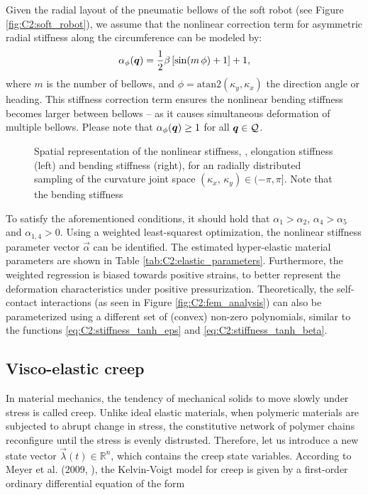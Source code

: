 %
\begin{asm}
Given the radial layout of the pneumatic bellows of the soft robot (see Figure \ref{fig:C2:soft_robot}), we assume that the nonlinear correction term for asymmetric radial stiffness along the circumference can be modeled by:
%
\begin{equation}
\alpha_\phi ({\boldsymbol{q}}) = \frac{1}{2}\beta \left[\sin( m \,\phi) + 1 \right] + 1,
\end{equation}
%
where $m$ is the number of bellows, and $\phi = \text{atan2}(\kappa_y,\kappa_x)$ the direction angle or heading. This stiffness correction term ensures the nonlinear bending stiffness becomes larger between bellows -- as it causes simultaneous deformation of multiple bellows. Please note that $\alpha_\phi({\boldsymbol{q}}) \ge 1$ for all ${\boldsymbol{q}} \in \mathcal{Q}$.
\end{asm}

\begin{figure}[!t]
 \vspace{-3mm}
  \centering
  
  \vspace{-0.25cm}
  \caption{Spatial representation of the nonlinear stiffness, \ie,  elongation stiffness (left) and bending stiffness (right), for an radially distributed sampling of the curvature joint space $(\kappa_x,\,\kappa_y) \in (-\pi,\pi]$. Note that the bending stiffness }
  \vspace{-0.1cm}
  \label{fig:C2:stiffness_model}
\end{figure}

To satisfy the aforementioned conditions, it should hold that $\alpha_1 > \alpha_2 $, $\alpha_4 > \alpha_5$ and $\alpha_{1,4} > 0$. Using a weighted least-squarest optimization, the nonlinear stiffness parameter vector $\vec{\alpha}$ can be identified. The estimated hyper-elastic material parameters are shown in Table \ref{tab:C2:elastic_parameters}. Furthermore, the weighted regression is biased towards positive strains, to better represent the deformation characteristics under positive pressurization. Theoretically, the self-contact interactions (as seen in Figure \ref{fig:C2:fem_analysis}) can also be parameterized using a different set of (convex) non-zero polynomials, similar to the functions \eqref{eq:C2:stiffness_tanh_eps} and
\eqref{eq:C2:stiffness_tanh_beta}.

\subsection{Visco-elastic creep}
\noindent In material mechanics, the tendency of mechanical solids to move slowly under stress is called creep. Unlike ideal elastic materials, when polymeric materials are subjected to abrupt change in stress, the constitutive network of polymer chains reconfigure until the stress is evenly distrusted. Therefore, let us introduce a new state vector $\vec{\lambda}(t)\in \mathbb{R}^n$, which contains the creep state variables. According to Meyer et al. (2009, \cite{Meyer2009}), the Kelvin-Voigt model for creep is given by a first-order ordinary differential equation of the form

